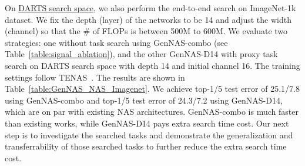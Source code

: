 \documentclass{article}
\begin{document}
On \underline{DARTS search space}, we also perform the end-to-end search on ImageNet-1k~\cite{deng2009imagenet} dataset. We fix the depth (layer) of the networks to be 14 and adjust the width (channel) so that the \# of FLOPs is between 500M to 600M. We evaluate two strategies: one without task search using GenNAS-combo (see Table~\ref{table:signal_ablation}), and the other {GenNAS-D14} with proxy task search on DARTS search space with depth 14 and initial channel 16. The training settings follow TENAS~\cite{chen2021neural}. The results are shown in Table~\ref{table:GenNAS_NAS_Imagenet}. We achieve top-1/5 test error of 25.1/7.8 using GenNAS-combo and top-1/5 test error of 24.3/7.2 using GenNAS-D14, which are on par with existing NAS architectures.  GenNAS-combo is much faster than existing works, while GenNAS-D14 pays extra search time cost. Our next step is to investigate the searched tasks and demonstrate the generalization and transferrability of those searched tasks to further reduce the extra search time cost. 
\end{document}
